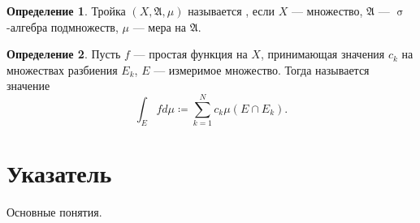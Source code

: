 \documentclass[a4paper]{article}
\theoremstyle{indented}
\theoremstyle{definition}
\newtheorem{defn}{Определение}
\theoremstyle{remark}
\DeclareMathOperator{\s}{\sigma}
\begin{document}
\begin{defn}
	Тройка $ (X,\mathfrak{A},\mu) $ называется , если $ X $ --- множество, $ \mathfrak{A} $ --- $ \s $-алгебра подмножеств, $ \mu $ --- мера на $ \mathfrak{A} $. 
\end{defn}

\begin{defn}
	Пусть $ f $ --- простая функция на $ X $, принимающая значения $ c_k $ на множествах разбиения $ E_k $, $ E $ --- измеримое множество. Тогда  называется значение  
	\begin{equation}
	\int_E{f d \mu}\coloneqq\sum_{k=1}^N{c_k\mu(E\cap E_k)}.
	\end{equation}
\end{defn}

\newpage


\section{Указатель}

\hypertarget{uk}{Основные понятия.}
\end{document}

